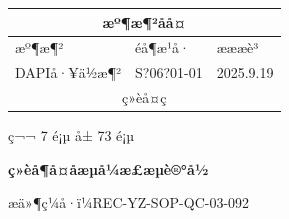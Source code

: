 \documentclass[UTF8,10pt,a4paper,fontset=fandol]{ctexart}
\newcommand{\fieldvalue}[1]{#1}
\newcommand{\handwritten}[1]{#1}
\begin{document}
\begin{center}
\begin{tabularx}{\textwidth}{|p{}|X|p{}|}
\hline
\multicolumn{3}{|c|}{æº¶æ¶²åå¤} \\ \hline
æº¶æ¶² & éå¶æ¹å· & æææè³ \\ \hline
DAPIå·¥ä½æ¶² &
\fieldvalue{\handwritten{S?06?01-01}} &
\fieldvalue{\handwritten{2025.9.19}} \\ \hline
\multicolumn{3}{|c|}{ç»èå¤ç} \\ \hline
\end{tabularx}
\end{center}

\begin{center}
ç¬¬ 7 é¡µ å± 73 é¡µ
\end{center}

\newpage

\begin{center}
\textbf{ç»èå¶å¤åæµå¼æ£æµè®°å½}
\end{center}

æä»¶ç¼å·ï¼REC-YZ-SOP-QC-03-092
\end{document}
